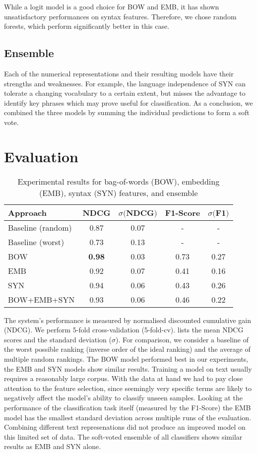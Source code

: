 While a logit model is a good choice for BOW and EMB, it has shown unsatisfactory performances on syntax features.
Therefore, we chose random forests, which perform significantly better in this case.

\subsection{Ensemble}
Each of the numerical representations and their resulting models have their strengths and weaknesses.
For example, the language independence of SYN can tolerate a changing vocabulary to a certain extent, but misses the advantage to identify key phrases which may prove useful for classification.
As a conclusion, we combined the three models by summing the individual predictions to form a soft vote.

\section{Evaluation}

\begin{table}[tb]
	\caption{Experimental results for bag-of-words (BOW), embedding (EMB), syntax (SYN) features, and ensemble}
	\label{tab:results}
	\begin{tabular}{lcccc}
		\toprule
		Approach & NDCG & $\sigma ($NDCG$)$ & F1-Score &  $\sigma ($F1$)$\\
		\midrule
		Baseline (random) & 0.87 & 0.07 & - & - \\
		Baseline (worst)  & 0.73 & 0.13 & - & - \\
		\midrule
		BOW & \textbf{0.98} & 0.03 & 0.73 & 0.27\\
		EMB & 0.92 & 0.07 & 0.41 & 0.16\\
		SYN & 0.94 & 0.06 & 0.43 & 0.26 \\
		BOW+EMB+SYN& 0.93 & 0.06 & 0.46 & 0.22\\
		\bottomrule
	\end{tabular}
\end{table}

The system's performance is measured by normalised discounted cumulative gain (NDCG).%
We perform 5-fold cross-validation (5-fold-cv).
 lists the mean NDCG scores and the standard deviation ($\sigma$).
For comparison, we consider a baseline of the worst possible ranking (inverse order of the ideal ranking) and the average of multiple random rankings.
The BOW model performed best in our experiments, the EMB and SYN models show similar results. 
Training a model on text usually requires a reasonably large corpus.
With the data at hand we had to pay close attention to the feature selection, since seemingly very specific terms are likely to negatively affect the model's ability to classify unseen samples.
Looking at the performance of the classification task itself (measured by the F1-Score) the EMB model has the smallest standard deviation across multiple runs of the evaluation.
Combining different text represenations did not produce an improved model on this limited set of data.
The soft-voted ensemble of all classifiers shows similar results as EMB and SYN alone.

